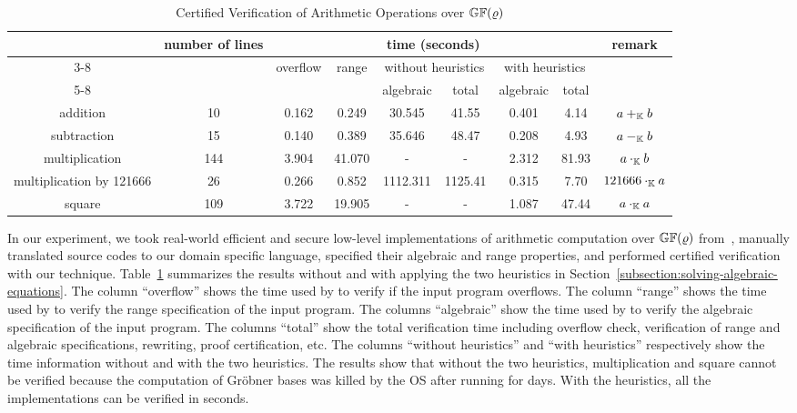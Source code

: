 \begin{table*}
  \caption{Certified Verification of Arithmetic Operations over
    $\mathbb{GF}(\varrho)$}
  \centering
  \begin{tabular}{|c|c|c|c|c|c|c|c|c|}
    \hline
    \multirow{3}{*}{} & \multirow{3}{*}{number of lines} & \multicolumn{6}{|c|}{time (seconds)} & \multirow{3}{*}{remark} \\ \cline{3-8}
    & & \multirow{2}{*}{overflow} & \multirow{2}{*}{range} & \multicolumn{2}{|c|}{without heuristics} & \multicolumn{2}{|c|}{with heuristics} & \\ \cline{5-8}
    & & & & algebraic & total & algebraic & total & \\
    \hline
    addition                 & 10  & 0.162 & 0.249 & 30.545 & 41.55 & 0.401 & 4.14 & $a +_{\mathbb{K}} b$ \\
    \hline
    subtraction              & 15  & 0.140 & 0.389 & 35.646 & 48.47 & 0.208 & 4.93 & $a -_{\mathbb{K}} b$ \\
    \hline
    multiplication           & 144 & 3.904 & 41.070 & - & - & 2.312 & 81.93 & $a \cdot_{\mathbb{K}} b$\\
    \hline
    multiplication by 121666 & 26  & 0.266 & 0.852 & 1112.311 & 1125.41 & 0.315 & 7.70 & $121666 \cdot_{\mathbb{K}} a$\\
    \hline
    square                   & 109 & 3.722 & 19.905  & - & - & 1.087 & 47.44 & $a \cdot_{\mathbb{K}} a$\\
    \hline
  \end{tabular}
  \label{table:arithmetic-operations}
\end{table*}

In our experiment, we took real-world efficient and secure
low-level implementations of arithmetic computation over
$\mathbb{GF}(\varrho)$ from~\cite{BDL+:11:HSHSS,BDL+:12:HSHSS},
manually translated source
codes to our domain specific language, specified their algebraic and range
properties, and performed certified verification with our technique.
Table~\ref{table:arithmetic-operations} summarizes the results
without and with applying the two heuristics in Section~\ref{subsection:solving-algebraic-equations}.
The column ``overflow'' shows the time used by \boolector to verify if the input program overflows.
The column ``range'' shows the time used by \boolector to verify the range specification of the input program.
The columns ``algebraic'' show the time used by \singular to verify the algebraic specification of the input program.
The columns ``total'' show the total verification time including overflow check, verification of range and algebraic specifications, rewriting, proof certification, etc.
The columns ``without heuristics'' and ``with heuristics'' respectively show the time information without and with the two heuristics.
The results show that without the two heuristics, multiplication and square
cannot be verified because the computation of Gr\"obner bases was killed by the OS
after running for days.
With the heuristics, all the implementations can be verified in seconds.




